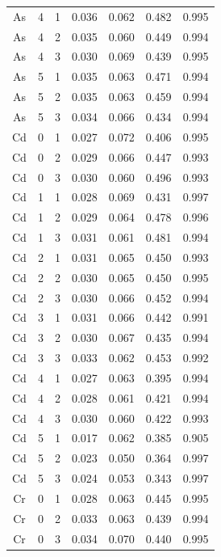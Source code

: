 \documentclass[ms, hidelinks]{uncgdissertationexp3}
\theoremstyle{plain}
\theoremstyle{definition}
\theoremstyle{remark}
\begin{document}
\begin{longtable}{ccccccc}
  \rowcolor{gray!6}  As & 4 & 1 & 0.036 & 0.062 & 0.482 & 0.995\\
  As & 4 & 2 & 0.035 & 0.060 & 0.449 & 0.994\\
  \rowcolor{gray!6}  As & 4 & 3 & 0.030 & 0.069 & 0.439 & 0.995\\
  As & 5 & 1 & 0.035 & 0.063 & 0.471 & 0.994\\
  \rowcolor{gray!6}  As & 5 & 2 & 0.035 & 0.063 & 0.459 & 0.994\\
  As & 5 & 3 & 0.034 & 0.066 & 0.434 & 0.994\\
  \rowcolor{gray!6}  Cd & 0 & 1 & 0.027 & 0.072 & 0.406 & 0.995\\
  Cd & 0 & 2 & 0.029 & 0.066 & 0.447 & 0.993\\
  \rowcolor{gray!6}  Cd & 0 & 3 & 0.030 & 0.060 & 0.496 & 0.993\\
  Cd & 1 & 1 & 0.028 & 0.069 & 0.431 & 0.997\\
  \rowcolor{gray!6}  Cd & 1 & 2 & 0.029 & 0.064 & 0.478 & 0.996\\
  Cd & 1 & 3 & 0.031 & 0.061 & 0.481 & 0.994\\
  \rowcolor{gray!6}  Cd & 2 & 1 & 0.031 & 0.065 & 0.450 & 0.993\\
  Cd & 2 & 2 & 0.030 & 0.065 & 0.450 & 0.995\\
  \rowcolor{gray!6}  Cd & 2 & 3 & 0.030 & 0.066 & 0.452 & 0.994\\
  Cd & 3 & 1 & 0.031 & 0.066 & 0.442 & 0.991\\
  \rowcolor{gray!6}  Cd & 3 & 2 & 0.030 & 0.067 & 0.435 & 0.994\\
  Cd & 3 & 3 & 0.033 & 0.062 & 0.453 & 0.992\\
  \rowcolor{gray!6}  Cd & 4 & 1 & 0.027 & 0.063 & 0.395 & 0.994\\
  Cd & 4 & 2 & 0.028 & 0.061 & 0.421 & 0.994\\
  \rowcolor{gray!6}  Cd & 4 & 3 & 0.030 & 0.060 & 0.422 & 0.993\\
  Cd & 5 & 1 & 0.017 & 0.062 & 0.385 & 0.905\\
  \rowcolor{gray!6}  Cd & 5 & 2 & 0.023 & 0.050 & 0.364 & 0.997\\
  Cd & 5 & 3 & 0.024 & 0.053 & 0.343 & 0.997\\
  \rowcolor{gray!6}  Cr & 0 & 1 & 0.028 & 0.063 & 0.445 & 0.995\\
  Cr & 0 & 2 & 0.033 & 0.063 & 0.439 & 0.994\\
  \rowcolor{gray!6}  Cr & 0 & 3 & 0.034 & 0.070 & 0.440 & 0.995\\

\end{longtable}
\end{document}
